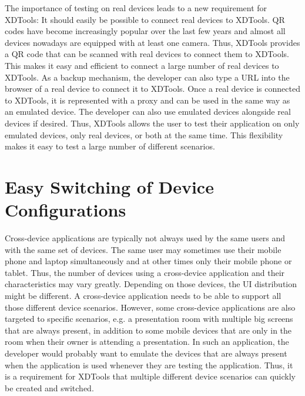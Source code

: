 The importance of testing on real devices leads to a new requirement for XDTools: It should easily be possible to connect real devices to XDTools. QR codes have become increasingly popular over the last few years and almost all devices nowadays are equipped with at least one camera. Thus, XDTools provides a QR code that can be scanned with real devices to connect them to XDTools. This makes it easy and efficient to connect a large number of real devices to XDTools. As a backup mechanism, the developer can also type a URL into the browser of a real device to connect it to XDTools. Once a real device is connected to XDTools, it is represented with a proxy and can be used in the same way as an emulated device. The developer can also use emulated devices alongside real devices if desired. Thus, XDTools allows the user to test their application on only emulated devices, only real devices, or both at the same time. This flexibility makes it easy to test a large number of different scenarios.

\section{Easy Switching of Device Configurations}

Cross-device applications are typically not always used by the same users and with the same set of devices. The same user may sometimes use their mobile phone and laptop simultaneously and at other times only their mobile phone or tablet. Thus, the number of devices using a cross-device application and their characteristics may vary greatly. Depending on those devices, the UI distribution might be different. A cross-device application needs to be able to support all those different device scenarios. However, some cross-device applications are also targeted to specific scenarios, e.g. a presentation room with multiple big screens that are always present, in addition to some mobile devices that are only in the room when their owner is attending a presentation. In such an application, the developer would probably want to emulate the devices that are always present when the application is used whenever they are testing the application. Thus, it is a requirement for XDTools that multiple different device scenarios can quickly be created and switched. 

